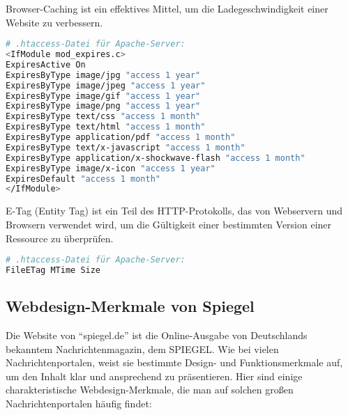 \documentclass[12pt,a4paper]{scrartcl}
\begin{document}
Browser-Caching ist ein effektives Mittel, um die Ladegeschwindigkeit
einer Website zu verbessern.

\begin{lstlisting}[language=bash]
# .htaccess-Datei für Apache-Server:
<IfModule mod_expires.c>
ExpiresActive On
ExpiresByType image/jpg "access 1 year"
ExpiresByType image/jpeg "access 1 year"
ExpiresByType image/gif "access 1 year"
ExpiresByType image/png "access 1 year"
ExpiresByType text/css "access 1 month"
ExpiresByType text/html "access 1 month"
ExpiresByType application/pdf "access 1 month"
ExpiresByType text/x-javascript "access 1 month"
ExpiresByType application/x-shockwave-flash "access 1 month"
ExpiresByType image/x-icon "access 1 year"
ExpiresDefault "access 1 month"
</IfModule>
\end{lstlisting}

E-Tag (Entity Tag) ist ein Teil des HTTP-Protokolls, das von Webservern
und Browsern verwendet wird, um die Gültigkeit einer bestimmten Version
einer Ressource zu überprüfen.

\begin{lstlisting}[language=bash]
# .htaccess-Datei für Apache-Server:
FileETag MTime Size
\end{lstlisting}

\hypertarget{webdesign-merkmale-von-spiegel}{%
\subsection{Webdesign-Merkmale von
Spiegel}\label{webdesign-merkmale-von-spiegel}}

Die Website von ``spiegel.de'' ist die Online-Ausgabe von Deutschlands
bekanntem Nachrichtenmagazin, dem SPIEGEL. Wie bei vielen
Nachrichtenportalen, weist sie bestimmte Design- und Funktionsmerkmale
auf, um den Inhalt klar und ansprechend zu präsentieren. Hier sind
einige charakteristische Webdesign-Merkmale, die man auf solchen großen
Nachrichtenportalen häufig findet:
\end{document}
